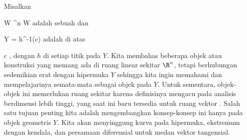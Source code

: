 
Misalkan

\mavergleichskette
{\vergleichskette
{ W
}
{ \subseteq }{ \R^n
}
{  }{
}
{    }{
}
{   }{
}
}
{}{}{}
 { W } { \R
} {}
adalah sebuah
dan

\mavergleichskette
{\vergleichskette
{ Y
}
{ = }{ h^{-1}(c)
}
{  }{
}
{    }{
}
{   }{
}
}
{}{}{}
adalah
di atas

\mavergleichskette
{\vergleichskette
{ c
}
{ \in }{ \R
}
{  }{
}
{    }{
}
{   }{
}
}
{}{}{,}
dengan $h$
di setiap titik pada $Y$. Kita membahas beberapa objek atau konstruksi yang memang ada di ruang linear sekitar $\R^n$, tetapi berhubungan sedemikian erat dengan hipermuka $Y$ sehingga kita ingin memahami dan mempelajarinya semata-mata sebagai objek pada $Y$. Untuk sementara, objek-objek ini memerlukan ruang sekitar karena definisinya mengacu pada analisis berdimensi lebih tinggi, yang saat ini baru tersedia untuk ruang vektor
 {} {}.
Salah satu tujuan penting kita adalah mengembangkan konsep-konsep ini hanya pada objek geometris
 {} {}
$Y$. Kita akan menyinggung kurva pada hipermuka, ekstremum dengan kendala, dan persamaan diferensial untuk medan vektor tangensial.

